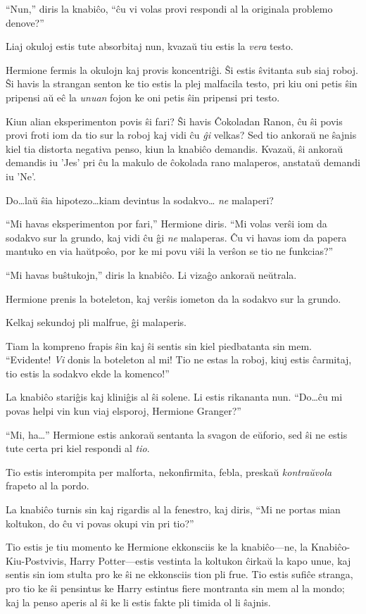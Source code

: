 ``Nun,'' diris la knabiĉo, ``ĉu vi volas provi respondi al la
originala problemo denove?''

Liaj okuloj estis tute absorbitaj nun, kvazaŭ tiu estis la \emph{vera}
testo.

Hermione fermis la okulojn kaj provis koncentriĝi. Ŝi estis ŝvitanta
sub siaj roboj. Ŝi havis la strangan senton ke tio estis la plej
malfacila testo, pri kiu oni petis ŝin pripensi aŭ eĉ la \emph{unuan}
fojon ke oni petis ŝin pripensi pri testo.

Kiun alian eksperimenton povis ŝi fari? Ŝi havis Ĉokoladan Ranon, ĉu
ŝi povis provi froti iom da tio sur la roboj kaj vidi ĉu \emph{ĝi}
velkas? Sed tio ankoraŭ ne ŝajnis kiel tia distorta negativa penso,
kiun la knabiĉo demandis. Kvazaŭ, ŝi ankoraŭ demandis iu 'Jes' pri ĉu
la makulo de ĉokolada rano malaperos, anstataŭ demandi iu 'Ne'.

Do\ldots laŭ ŝia hipotezo\ldots kiam devintus la sodakvo\ldots
\emph{ne} malaperi?

``Mi havas eksperimenton por fari,'' Hermione diris. ``Mi volas verŝi
iom da sodakvo sur la grundo, kaj vidi ĉu ĝi \emph{ne} malaperas. Ĉu
vi havas iom da papera mantuko en via haŭtpoŝo, por ke mi povu viŝi la
verŝon se tio ne funkcias?''

``Mi havas buŝtukojn,'' diris la knabiĉo. Li vizaĝo ankoraŭ neŭtrala.

Hermione prenis la boteleton, kaj verŝis iometon da la sodakvo sur la
grundo.

Kelkaj sekundoj pli malfrue, ĝi malaperis.

Tiam la kompreno frapis ŝin kaj ŝi sentis sin kiel piedbatanta sin
mem. ``Evidente! \emph{Vi} donis la boteleton al mi! Tio ne estas la
roboj, kiuj estis ĉarmitaj, tio estis la sodakvo ekde la komenco!''

La knabiĉo stariĝis kaj kliniĝis al ŝi solene. Li estis rikananta
nun. ``Do\ldots ĉu mi povas helpi vin kun viaj elsporoj, Hermione
Granger?''

``Mi, ha\ldots'' Hermione estis ankoraŭ sentanta la svagon de eŭforio,
sed ŝi ne estis tute certa pri kiel respondi al \emph{tio}.

Tio estis interompita per malforta, nekonfirmita, febla, preskaŭ
\emph{kontraŭvola} frapeto al la pordo.

La knabiĉo turnis sin kaj rigardis al la fenestro, kaj diris, ``Mi ne
portas mian koltukon, do ĉu vi povas okupi vin pri tio?''

Tio estis je tiu momento ke Hermione ekkonsciis ke la knabiĉo—ne, la
Knabiĉo-Kiu-Postvivis, Harry Potter—estis vestinta la koltukon ĉirkaŭ
la kapo unue, kaj sentis sin iom stulta pro ke ŝi ne ekkonsciis tion
pli frue. Tio estis sufiĉe stranga, pro tio ke ŝi pensintus ke Harry
estintus fiere montranta sin mem al la mondo; kaj la penso aperis al
ŝi ke li estis fakte pli timida ol li ŝajnis.

